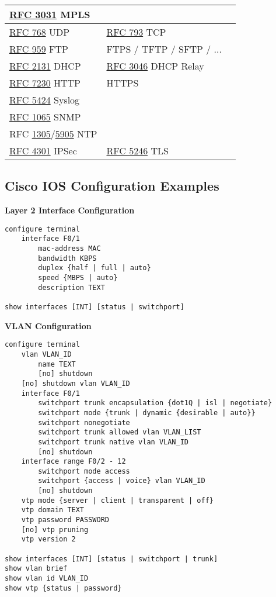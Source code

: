 \documentclass[12pt]{article}
\newcommand{\rfc}[1]{\href{https://datatracker.ietf.org/doc/html/rfc#1}{#1}}
\newcommand{\RFC}[1]{\href{https://datatracker.ietf.org/doc/html/rfc#1}{RFC #1}}
\begin{document}
\begin{table}[H]
\begin{tabular}{@{} l l r @{}}
	\RFC{3031} MPLS				&					& \Cref{sec:MPLS}\\\hline
	\RFC{768} UDP				& \RFC{793} TCP			& \Cref{subsec:UDP,subsec:TCP}\\\hline
	\RFC{959} FTP				& FTPS / TFTP / SFTP / ...	& \Cref{subsec:FTP}\\
	\RFC{2131} DHCP				& \RFC{3046} DHCP Relay	& \Cref{subsec:DHCP}\\
	\RFC{7230} HTTP				& HTTPS				& \Cref{subsec:HTTP}\\
	\RFC{5424} Syslog				&					& \Cref{subsec:SYSLOG}\\
	\RFC{1065} SNMP				&					&\\
	RFC \rfc{1305}/\rfc{5905} NTP		&					&\\
	\RFC{4301} IPSec				& \RFC{5246} TLS			&\\\hline	
	\end{tabular}\end{table}


	\newpage
	\subsection{Cisco IOS Configuration Examples \label{subsec:CONFIG}}
	\textbf{Layer 2 Interface Configuration}
	\begin{lstlisting}
configure terminal
	interface F0/1
		mac-address MAC
		bandwidth KBPS
		duplex {half | full | auto}
		speed {MBPS | auto}
		description TEXT

show interfaces [INT] [status | switchport]
	\end{lstlisting}

	\textbf{VLAN Configuration}
	\begin{lstlisting}
configure terminal
	vlan VLAN_ID
		name TEXT
		[no] shutdown
	[no] shutdown vlan VLAN_ID
	interface F0/1
		switchport trunk encapsulation {dot1Q | isl | negotiate}
		switchport mode {trunk | dynamic {desirable | auto}}
		switchport nonegotiate
		switchport trunk allowed vlan VLAN_LIST
		switchport trunk native vlan VLAN_ID
		[no] shutdown
	interface range F0/2 - 12
		switchport mode access
		switchport {access | voice} vlan VLAN_ID
		[no] shutdown
	vtp mode {server | client | transparent | off}
	vtp domain TEXT
	vtp password PASSWORD
	[no] vtp pruning
	vtp version 2

show interfaces [INT] [status | switchport | trunk]
show vlan brief
show vlan id VLAN_ID
show vtp {status | password}
	\end{lstlisting}
\end{document}
